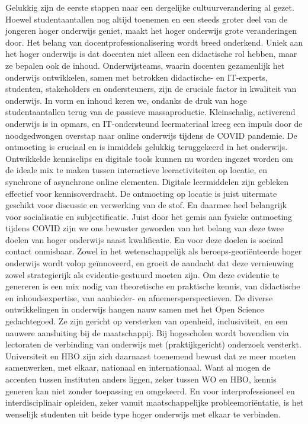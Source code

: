 \documentclass[empirical, authordate, ]{new-jote-article}
\begin{document}
	Gelukkig zijn de eerste stappen naar een dergelijke cultuurverandering al gezet. Hoewel studentaantallen nog altijd toenemen en een steeds groter deel van de jongeren hoger onderwijs geniet, maakt het hoger onderwijs grote veranderingen door. Het belang van docentprofessionalisering wordt breed onderkend. Uniek aan het hoger onderwijs is dat docenten niet alleen een didactische rol hebben, maar ze bepalen ook de inhoud. Onderwijsteams, waarin docenten gezamenlijk het onderwijs ontwikkelen, samen met betrokken didactische- en IT-experts, studenten, stakeholders en ondersteuners, zijn de cruciale factor in kwaliteit van onderwijs. In vorm en inhoud keren we, ondanks de druk van hoge studentaantallen terug van de passieve massaproductie. Kleinschalig, activerend onderwijs is in opmars, en IT-ondersteund leermateriaal kreeg een impuls door de noodgedwongen overstap naar online onderwijs tijdens de COVID pandemie. De ontmoeting is cruciaal en is inmiddels gelukkig teruggekeerd in het onderwijs. Ontwikkelde kennisclips en digitale tools kunnen nu worden ingezet worden om de ideale mix te maken tussen interactieve leeractiviteiten op locatie, en synchrone of asynchrone online elementen. Digitale leermiddelen zijn gebleken effectief voor kennisoverdracht. De ontmoeting op locatie is juist uitermate geschikt voor discussie en verwerking van de stof. En daarmee heel belangrijk voor socialisatie en subjectificatie. Juist door het gemis aan fysieke ontmoeting tijdens COVID zijn we ons bewuster geworden van het belang van deze twee doelen van hoger onderwijs naast kwalificatie. En voor deze doelen is sociaal contact onmisbaar. Zowel in het wetenschappelijk als beroeps-georiënteerde hoger onderwijs wordt volop geïnnoveerd, en groeit de aandacht dat deze vernieuwing zowel strategierijk als evidentie-gestuurd moeten zijn. Om deze evidentie te genereren is een mix nodig van theoretische en praktische kennis, van didactische en inhoudsexpertise, van aanbieder- en afnemersperspectieven. De diverse ontwikkelingen in onderwijs hangen nauw samen met het Open Science gedachtegoed. Ze zijn gericht op versterken van openheid, inclusiviteit, en een nauwere aansluiting bij de maatschappij. Bij hogescholen wordt bovendien via lectoraten de verbinding van onderwijs met (praktijkgericht) onderzoek versterkt. Universiteit en HBO zijn zich daarnaast toenemend bewust dat ze meer moeten samenwerken, met elkaar, nationaal en internationaal. Want al mogen de accenten tussen instituten anders liggen, zeker tussen WO en HBO, kennis generen kan niet zonder toepassing en omgekeerd. En voor interprofessioneel en interdisciplinair opleiden, zeker vanuit maatschappelijke probleemoriëntatie, is het wenselijk studenten uit beide type hoger onderwijs met elkaar te verbinden.
\end{document}
